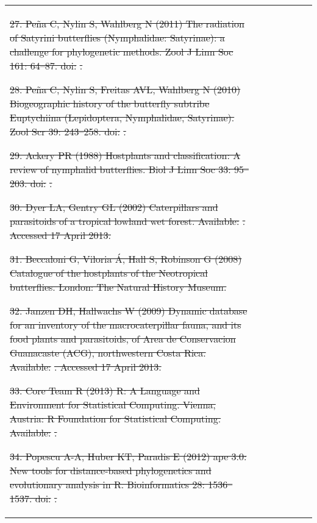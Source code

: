 \documentclass[10pt]{article}
\providecommand{\DIFdeltex}[1]{{\protect\color{red}\sout{#1}}}                      %
\providecommand{\DIFdelFL}[1]{\DIFdel{#1}} %
\providecommand{\DIFdel}[1]{\texorpdfstring{\DIFdeltex{#1}}{}} %
\begin{document}
\begin{table}[!h]
\begin{tabular}{lccrrcl}
\DIFdelFL{27. Peña C, Nylin S, Wahlberg N (2011) The radiation of Satyrini
butterflies (Nymphalidae: Satyrinae): a challenge for phylogenetic
methods. Zool J Linn Soc 161: 64--87.
doi:}%
\DIFdelFL{.
}%

\DIFdelFL{28. Peña C, Nylin S, Freitas AVL, Wahlberg N (2010) Biogeographic
history of the butterfly subtribe Euptychiina (Lepidoptera, Nymphalidae,
Satyrinae). Zool Scr 39: 243--258.
doi:}%
\DIFdelFL{.
}%

\DIFdelFL{29. Ackery PR (1988) Hostplants and classification: A review of
nymphalid butterflies. Biol J Linn Soc 33: 95--203.
doi:}%
\DIFdelFL{.
}%

\DIFdelFL{30. Dyer LA, Gentry GL (2002) Caterpillars and parasitoids of a tropical
lowland wet forest. Available: }%
\DIFdelFL{.
Accessed 17 April 2013.
}%

\DIFdelFL{31. Beccaloni G, Viloria Á, Hall S, Robinson G (2008) Catalogue of the
hostplants of the Neotropical butterflies. London: The Natural History
Museum.
}%

\DIFdelFL{32. Janzen DH, Hallwachs W (2009) Dynamic database for an inventory of
the macrocaterpillar fauna, and its food plants and parasitoids, of Area
de Conservacion Guanacaste (ACG), northwestern Costa Rica. Available:
}%
\DIFdelFL{. Accessed 17 April 2013.
}%

\DIFdelFL{33. Core Team R (2013) R: A Language and Environment for Statistical
Computing. Vienna, Austria: R Foundation for Statistical Computing.
Available: }%
\DIFdelFL{.
}%

\DIFdelFL{34. Popescu A-A, Huber KT, Paradis E (2012) ape 3.0: New tools for
distance-based phylogenetics and evolutionary analysis in R.
Bioinformatics 28: 1536--1537.
doi:}%
\DIFdelFL{.
}%


\end{tabular}
\end{table}
\end{document}
